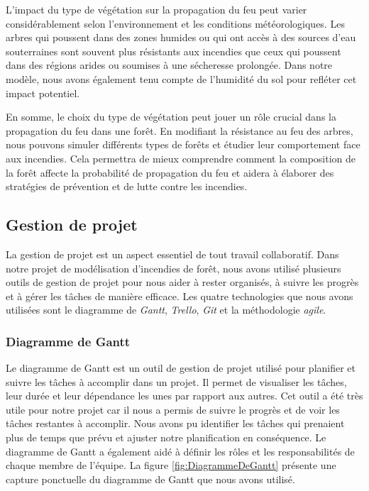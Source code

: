 L'impact du type de végétation sur la propagation du feu peut varier considérablement selon l'environnement et les conditions météorologiques. Les arbres qui poussent dans des zones humides ou qui ont accès à des sources d'eau souterraines sont souvent plus résistants aux incendies que ceux qui poussent dans des régions arides ou soumises à une sécheresse prolongée. Dans notre modèle, nous avons également tenu compte de l'humidité du sol pour refléter cet impact potentiel.

En somme, le choix du type de végétation peut jouer un rôle crucial dans la propagation du feu dans une forêt. En modifiant la résistance au feu des arbres, nous pouvons simuler différents types de forêts et étudier leur comportement face aux incendies. Cela permettra de mieux comprendre comment la composition de la forêt affecte la probabilité de propagation du feu et aidera à élaborer des stratégies de prévention et de lutte contre les incendies.

\subsection{Gestion de projet}

La gestion de projet est un aspect essentiel de tout travail collaboratif. Dans notre projet de modélisation d'incendies de forêt, nous avons utilisé plusieurs outils de gestion de projet pour nous aider à rester organisés, à suivre les progrès et à gérer les tâches de manière efficace. Les quatre technologies que nous avons utilisées sont le diagramme de \textit{Gantt}, \textit{Trello}, \textit{Git} et la méthodologie \textit{agile}.

\subsubsection{Diagramme de Gantt}

Le diagramme de Gantt est un outil de gestion de projet utilisé pour planifier et suivre les tâches à accomplir dans un projet. Il permet de visualiser les tâches, leur durée et leur dépendance les unes par rapport aux autres. Cet outil a été très utile pour notre projet car il nous a permis de suivre le progrès et de voir les tâches restantes à accomplir. Nous avons pu identifier les tâches qui prenaient plus de temps que prévu et ajuster notre planification en conséquence. Le diagramme de Gantt a également aidé à définir les rôles et les responsabilités de chaque membre de l'équipe. La figure \ref{fig:DiagrammeDeGantt} présente une capture ponctuelle du diagramme de Gantt que nous avons utilisé.

